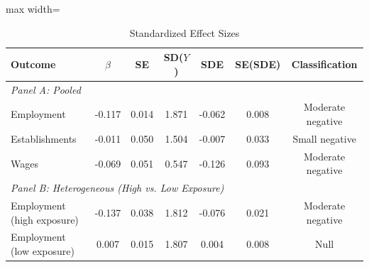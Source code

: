 \begin{table}[htbp]
\centering
\caption{Standardized Effect Sizes}
\label{tab:sde}
\begin{adjustbox}{max width=\textwidth}
\begin{tabular}{lcccccc}
\toprule
Outcome & $\hat{\beta}$ & SE & SD($Y$) & SDE & SE(SDE) & Classification \\
\midrule
\multicolumn{7}{l}{\textit{Panel A: Pooled}} \\
\midrule
Employment & -0.117 & 0.014 & 1.871 & -0.062 & 0.008 & Moderate negative \\
Establishments & -0.011 & 0.050 & 1.504 & -0.007 & 0.033 & Small negative \\
Wages & -0.069 & 0.051 & 0.547 & -0.126 & 0.093 & Moderate negative \\
\midrule
\multicolumn{7}{l}{\textit{Panel B: Heterogeneous (High vs. Low Exposure)}} \\
\midrule
Employment (high exposure) & -0.137 & 0.038 & 1.812 & -0.076 & 0.021 & Moderate negative \\
Employment (low exposure) & 0.007 & 0.015 & 1.807 & 0.004 & 0.008 & Null \\
\bottomrule
\end{tabular}
\end{adjustbox}
\begin{tablenotes}[flushleft]
\small

\end{tablenotes}
\end{table}
